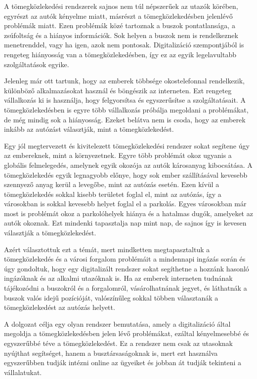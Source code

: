 A tömegközlekedési rendszerek sajnos nem túl népszerűek az utazók körében, egyrészt az autók kényelme miatt, másrészt a tömegközlekedésben jelenlévő problémák miatt. Ezen problémák közé tartoznak a buszok pontatlansága, a zsúfoltság és a hiányos információk. Sok helyen a buszok nem is rendelkeznek menetrenddel, vagy ha igen, azok nem pontosak. Digitalizáció szempontjából is rengeteg hiányosság van a tömegközlekedésben, így ez az egyik legelavultabb szolgáltatások egyike.

Jelenleg már ott tartunk, hogy az emberek többsége okostelefonnal rendelkezik, különböző alkalmazásokat használ és böngészik az interneten. Ezt rengeteg vállalkozás ki is használja, hogy felgyorsítsa és egyszerűsítse a szolgáltatásait. A tömegközlekedésben is egyre több vállalkozás próbálja megoldani a problémákat, de még mindig sok a hiányosság. Ezeket belátva nem is csoda, hogy az emberek inkább az autózást választják, mint a tömegközlekedést.

Egy jól megtervezett és kivitelezett tömegközlekedési rendszer sokat segítene úgy az embereknek, mint a környezetnek. Egyre több problémát okoz ugyanis a globális felmelegedés, amelynek egyik okozója az autók károsanyag kibocsátása. A tömegközlekedés egyik legnagyobb előnye, hogy sok ember szállításával kevesebb szennyező anyag kerül a levegőbe, mint az autózás esetén. Ezen kívül a tömegközlekedés sokkal kisebb területet foglal el, mint az autózás, így a városokban is sokkal kevesebb helyet foglal el a parkolás. Egyes városokban már most is problémát okoz a parkolóhelyek hiánya és a hatalmas dugók, amelyeket az autók okoznak. Ezt mindenki tapasztalja nap mint nap, de sajnos így is kevesen választják a tömegközlekedést.

Azért választottuk ezt a témát, mert mindketten megtapasztaltuk a tömegközlekedés és a városi forgalom problémáit a mindennapi ingázás során és úgy gondoltuk, hogy egy digitalizált rendszer sokat segíthetne a hozzánk hasonló ingázóknak és az alkalmi utazóknak is. Ha az emberek interneten tudnának tájékozódni a buszokról és a forgalomról, vásárolhatnának jegyet, és láthatnák a buszok valós idejű pozícióját, valószínűleg sokkal többen választanák a tömegközlekedést az autózás helyett.

A dolgozat célja egy olyan rendszer bemutatása, amely a digitalizáció által megoldja a tömegközlekedésben jelen lévő problémákat, ezáltal kényelmesebbé és egyszerűbbé téve a tömegközlekedést. Ez a rendszer nem csak az utasoknak nyújthat segítséget, hanem a busztársaságoknak is, mert ezt használva egyszerűbben tudják intézni online az ügyeiket és jobban át tudják tekinteni a vállalatukat.

